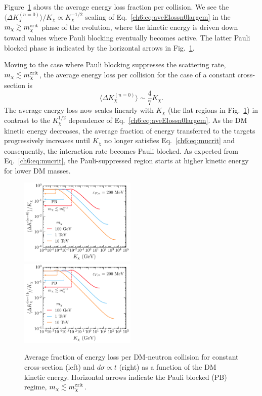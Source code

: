 Figure~\ref{ch6:fig:Taven0} shows the average energy loss fraction per collision. We see the  $\langle \Delta K_\chi^{(n=0)} \rangle/K_\chi \propto K_\chi^{-1/2}$ scaling of Eq.~\ref{ch6:eq:aveElossn0largem}
in the $m_\chi \gtrsim m_\chi^{\rm crit}$ phase of the evolution, where the kinetic energy is driven down toward values where Pauli blocking eventually becomes active. The latter Pauli blocked phase is indicated by the horizontal arrows in Fig.~\ref{ch6:fig:Taven0}. 





Moving to the case where Pauli blocking suppresses the scattering rate, $m_\chi\lesssim m_\chi^{\rm crit}$, the average energy loss per collision for the case of a constant cross-section is
\begin{equation}
\langle \Delta K_\chi^{(n=0)} \rangle \sim 
\frac{4}{7}K_\chi. 
\label{ch6:eq:aveElossn0}
\end{equation}
The average energy loss now scales linearly with $K_\chi$ (the flat regions in Fig.~\ref{ch6:fig:Taven0}) in contrast to the $K_\chi^{1/2}$ dependence of Eq.~\ref{ch6:eq:aveElossn0largem}.
As the DM kinetic energy decreases, the average fraction of energy transferred to the targets progressively increases until $K_\chi$ no longer satisfies Eq.~\ref{ch6:eq:mucrit} and consequently, the interaction rate becomes Pauli blocked.
As expected from Eq.~\ref{ch6:eq:mucrit}, the Pauli-suppressed region starts at higher kinetic energy for lower DM masses. 


\begin{figure}[t!bp]
  \centering
  \includegraphics[width=0.495\textwidth]{q0ave_Tdm_n0.pdf}
  \includegraphics[width=0.495\textwidth]{q0ave_Tdm_n1.pdf}
  \caption{Average fraction of energy loss per DM-neutron collision for constant cross-section (left) and $d\sigma\propto t$ (right) as a function of the DM kinetic energy. Horizontal arrows indicate the Pauli blocked (PB) regime, $m_\chi\lesssim m_\chi^{\rm crit}$. 
  } 
  \label{ch6:fig:Taven0}
\end{figure}




